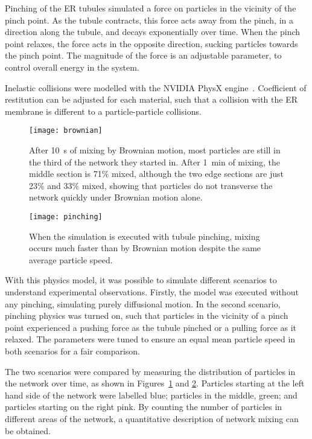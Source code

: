 Pinching of the ER tubules simulated a force on particles in the vicinity of the pinch point. 
As the tubule contracts, this force acts away from the pinch, in a direction along the tubule, and decays exponentially over time. 
When the pinch point relaxes, the force acts in the opposite direction, sucking particles towards the pinch point. 
The magnitude of the force is an adjustable parameter, to control overall energy in the system. 

Inelastic collisions were modelled with the NVIDIA PhysX engine~\cite{nvidia2008physx}. 
Coefficient of restitution can be adjusted for each material, such that a collision with the ER membrane is different to a particle-particle collisions. 

\begin{figure}[t!]
	\centering
	\texttt{[image: brownian]}
	\caption[ER simulation: After one minute of mixing by Brownian motion the simulated ER mixture is not homogeneous]{After \SI{10}{\second} of mixing by Brownian motion, most particles are still in the third of the network they started in. After \SI{1}{\minute} of mixing, the middle section is 71\% mixed, although the two edge sections are just 23\% and 33\% mixed, showing that particles do not transverse the network quickly under Brownian motion alone. }
	\label{fig:ER-simulation-brownian}
\end{figure}

\begin{figure}[t!]
	\centering
	\texttt{[image: pinching]}
	\caption[ER simulation: A homogeneous mixture is achieved after one minute in the ER simulation with pinching]{When the simulation is executed with tubule pinching, mixing occurs much faster than by Brownian motion despite the same average particle speed.}
	\label{fig:ER-simulation-pinching}
\end{figure}

With this physics model, it was possible to simulate different scenarios to understand experimental observations. 
Firstly, the model was executed without any pinching, simulating purely diffusional motion. 
In the second scenario, pinching physics was turned on, such that particles in the vicinity of a pinch point experienced a pushing force as the tubule pinched or a pulling force as it relaxed. 
The parameters were tuned to ensure an equal mean particle speed in both scenarios for a fair comparison. 

The two scenarios were compared by measuring the distribution of particles in the network over time, as shown in Figures~\ref{fig:ER-simulation-brownian} and \ref{fig:ER-simulation-pinching}. 
Particles starting at the left hand side of the network were labelled blue; particles in the middle, green; and particles starting on the right pink. 
By counting the number of particles in different areas of the network, a quantitative description of network mixing can be obtained. 

